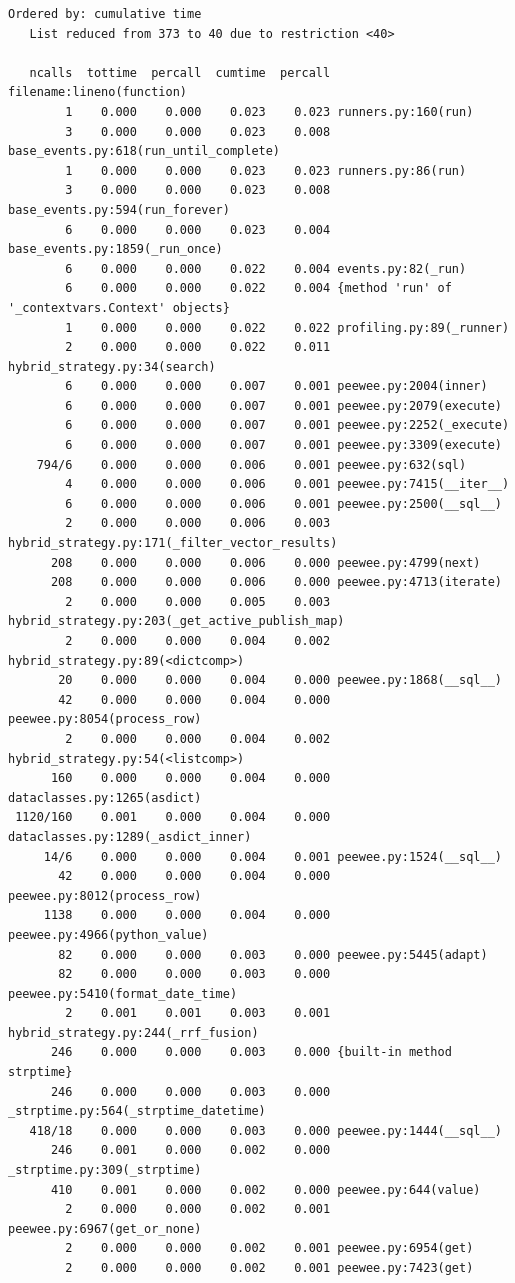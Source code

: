 \documentclass[a4paper,12pt]{article}
\begin{document}
\begin{lstlisting}[basicstyle=\ttfamily\fontsize{9}{9}\selectfont]
   Ordered by: cumulative time
   List reduced from 373 to 40 due to restriction <40>

   ncalls  tottime  percall  cumtime  percall filename:lineno(function)
        1    0.000    0.000    0.023    0.023 runners.py:160(run)
        3    0.000    0.000    0.023    0.008 base_events.py:618(run_until_complete)
        1    0.000    0.000    0.023    0.023 runners.py:86(run)
        3    0.000    0.000    0.023    0.008 base_events.py:594(run_forever)
        6    0.000    0.000    0.023    0.004 base_events.py:1859(_run_once)
        6    0.000    0.000    0.022    0.004 events.py:82(_run)
        6    0.000    0.000    0.022    0.004 {method 'run' of '_contextvars.Context' objects}
        1    0.000    0.000    0.022    0.022 profiling.py:89(_runner)
        2    0.000    0.000    0.022    0.011 hybrid_strategy.py:34(search)
        6    0.000    0.000    0.007    0.001 peewee.py:2004(inner)
        6    0.000    0.000    0.007    0.001 peewee.py:2079(execute)
        6    0.000    0.000    0.007    0.001 peewee.py:2252(_execute)
        6    0.000    0.000    0.007    0.001 peewee.py:3309(execute)
    794/6    0.000    0.000    0.006    0.001 peewee.py:632(sql)
        4    0.000    0.000    0.006    0.001 peewee.py:7415(__iter__)
        6    0.000    0.000    0.006    0.001 peewee.py:2500(__sql__)
        2    0.000    0.000    0.006    0.003 hybrid_strategy.py:171(_filter_vector_results)
      208    0.000    0.000    0.006    0.000 peewee.py:4799(next)
      208    0.000    0.000    0.006    0.000 peewee.py:4713(iterate)
        2    0.000    0.000    0.005    0.003 hybrid_strategy.py:203(_get_active_publish_map)
        2    0.000    0.000    0.004    0.002 hybrid_strategy.py:89(<dictcomp>)
       20    0.000    0.000    0.004    0.000 peewee.py:1868(__sql__)
       42    0.000    0.000    0.004    0.000 peewee.py:8054(process_row)
        2    0.000    0.000    0.004    0.002 hybrid_strategy.py:54(<listcomp>)
      160    0.000    0.000    0.004    0.000 dataclasses.py:1265(asdict)
 1120/160    0.001    0.000    0.004    0.000 dataclasses.py:1289(_asdict_inner)
     14/6    0.000    0.000    0.004    0.001 peewee.py:1524(__sql__)
       42    0.000    0.000    0.004    0.000 peewee.py:8012(process_row)
     1138    0.000    0.000    0.004    0.000 peewee.py:4966(python_value)
       82    0.000    0.000    0.003    0.000 peewee.py:5445(adapt)
       82    0.000    0.000    0.003    0.000 peewee.py:5410(format_date_time)
        2    0.001    0.001    0.003    0.001 hybrid_strategy.py:244(_rrf_fusion)
      246    0.000    0.000    0.003    0.000 {built-in method strptime}
      246    0.000    0.000    0.003    0.000 _strptime.py:564(_strptime_datetime)
   418/18    0.000    0.000    0.003    0.000 peewee.py:1444(__sql__)
      246    0.001    0.000    0.002    0.000 _strptime.py:309(_strptime)
      410    0.001    0.000    0.002    0.000 peewee.py:644(value)
        2    0.000    0.000    0.002    0.001 peewee.py:6967(get_or_none)
        2    0.000    0.000    0.002    0.001 peewee.py:6954(get)
        2    0.000    0.000    0.002    0.001 peewee.py:7423(get)



\end{lstlisting}
\end{document}
